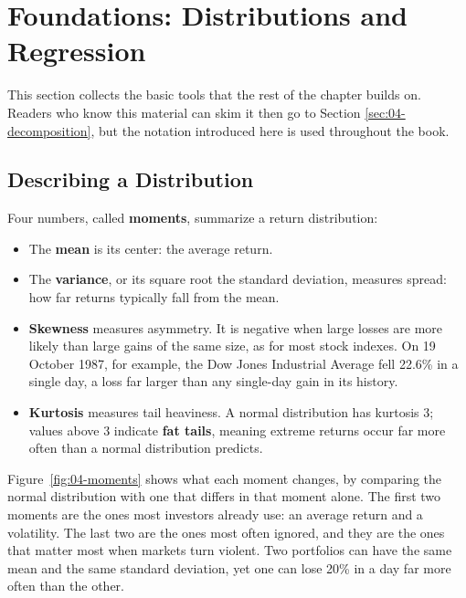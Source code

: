 \section{Foundations: Distributions and Regression}
\label{sec:04-foundations}

This section collects the basic tools that the rest of the chapter builds on.
Readers who know this material can skim it then go to Section \ref{sec:04-decomposition}, but the notation introduced here is used throughout the book.

\subsection{Describing a Distribution}
Four numbers, called \textbf{moments}, summarize a return distribution:
\begin{itemize}
  \item The \textbf{mean} is its center: the average return.
  \item The \textbf{variance}, or its square root the standard deviation, measures spread: how far returns typically fall from the mean.
  \item \textbf{Skewness} measures asymmetry. It is negative when large losses are more likely than large gains of the same size, as for most stock indexes. On 19 October 1987, for example, the Dow Jones Industrial Average fell 22.6\% in a single day, a loss far larger than any single-day gain in its history.
  \item \textbf{Kurtosis} measures tail heaviness. A normal distribution has kurtosis 3; values above 3 indicate \textbf{fat tails}, meaning extreme returns occur far more often than a normal distribution predicts.
\end{itemize}

Figure~\ref{fig:04-moments} shows what each moment changes, by comparing the normal distribution with one that differs in that moment alone. The first two moments are the ones most investors already use: an average return and a volatility. The last two are the ones most often ignored, and they are the ones that matter most when markets turn violent. Two portfolios can have the same mean and the same standard deviation, yet one can lose 20\% in a day far more often than the other.


